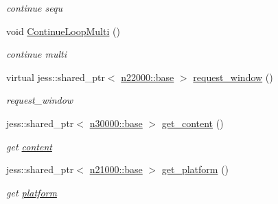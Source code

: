 \begin{DoxyCompactItemize}
\begin{DoxyCompactList}\small\item\em continue sequ \item\end{DoxyCompactList}\item 
void \hyperlink{classnebula_1_1framework_1_1app_a23ba61308754945c590aa257aa0b8a27}{ContinueLoopMulti} ()
\begin{DoxyCompactList}\small\item\em continue multi \item\end{DoxyCompactList}\item 
virtual jess::shared\_\-ptr$<$ \hyperlink{classnebula_1_1platform_1_1window_1_1base}{n22000::base} $>$ \hyperlink{classnebula_1_1framework_1_1app_a04794aa6c10b5f10c033b3389799a6f7}{request\_\-window} ()
\begin{DoxyCompactList}\small\item\em request\_\-window \item\end{DoxyCompactList}\item 
jess::shared\_\-ptr$<$ \hyperlink{classnebula_1_1content_1_1base}{n30000::base} $>$ \hyperlink{classnebula_1_1framework_1_1app_aaf19f1ba7f31909c8e05028cf125f330}{get\_\-content} ()
\begin{DoxyCompactList}\small\item\em get \hyperlink{namespacenebula_1_1content}{content} \item\end{DoxyCompactList}\item 
jess::shared\_\-ptr$<$ \hyperlink{classnebula_1_1platform_1_1platform_1_1base}{n21000::base} $>$ \hyperlink{classnebula_1_1framework_1_1app_a8f371e95cba208017eb9633b1f7466b2}{get\_\-platform} ()
\begin{DoxyCompactList}\small\item\em get \hyperlink{namespacenebula_1_1platform}{platform} \item\end{DoxyCompactList}\end{DoxyCompactItemize}
